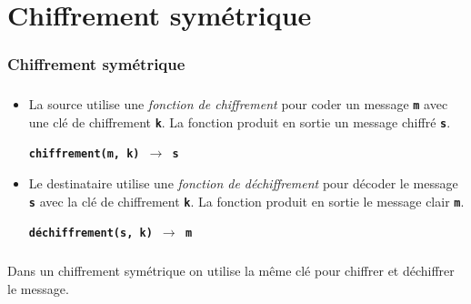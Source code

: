 \documentclass[svgnames,11pt]{beamer}
\begin{document}
\section{Chiffrement symétrique}
\begin{frame}
    \frametitle{Chiffrement symétrique}

    \begin{center}
    \end{center}

\end{frame}
\begin{frame}
    \frametitle{}

    \begin{itemize}
        \item<1-> La source utilise une \emph{fonction de chiffrement} pour coder un message \textbf{\texttt{m}} avec une clé de chiffrement \textbf{\texttt{k}}. La fonction produit en sortie un message chiffré \textbf{\texttt{s}}.
              \begin{center}
                  \textbf{\texttt{chiffrement(m, k) $\rightarrow$ s}}
              \end{center}
        \item<2-> Le destinataire utilise une \emph{fonction de déchiffrement} pour décoder le message \textbf{\texttt{s}} avec la clé de chiffrement \textbf{\texttt{k}}. La fonction produit en sortie le message clair \textbf{\texttt{m}}.
              \begin{center}
                  \textbf{\texttt{déchiffrement(s, k) $\rightarrow$ m}}
              \end{center}
    \end{itemize}

\end{frame}
\begin{frame}
    \frametitle{}

    \begin{aretenir}[]
        Dans un chiffrement symétrique on utilise la même clé pour chiffrer et déchiffrer le message.
        \end{aretenir}

\end{frame}
\end{document}
